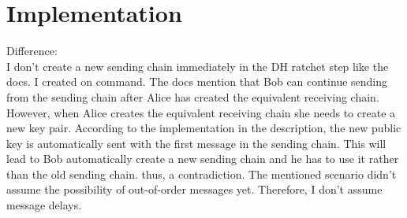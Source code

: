 \chapter{Implementation}
\label{ch:implementation}

Difference:\\
I don't create a new sending chain immediately in the DH ratchet step like the docs. I created on command. The docs mention that Bob can continue sending from the sending chain after Alice has created the equivalent receiving chain. However, when Alice creates the equivalent receiving chain she needs to create a new key pair. According to the implementation in the description, the new public key is automatically sent with the first message in the sending chain. This will lead to Bob automatically create a new sending chain and he has to use it rather than the old sending chain. thus, a contradiction. The mentioned scenario didn't assume the possibility of out-of-order messages yet. Therefore, I don't assume message delays.
